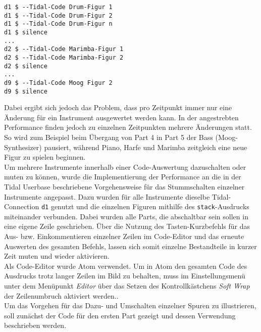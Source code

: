 \documentclass[
10pt, %
a4paper, %
oneside, %
headinclude,footinclude, %
BCOR5mm, %
]{scrartcl}
\begin{document}
\begin{lstlisting}
d1 $ --Tidal-Code Drum-Figur 1
d1 $ --Tidal-Code Drum-Figur 2
d1 $ --Tidal-Code Drum-Figur n
d1 $ silence
...
d2 $ --Tidal-Code Marimba-Figur 1
d2 $ --Tidal-Code Marimba-Figur 2
d2 $ silence
...
d9 $ --Tidal-Code Moog Figur 2
d9 $ silence
\end{lstlisting}

\noindent Dabei ergibt sich jedoch das Problem, dass pro Zeitpunkt immer nur eine Änderung für ein Instrument ausgewertet werden kann. In der angestrebten Performance finden jedoch zu einzelnen Zeitpunkten mehrere Änderungen statt. So wird zum Beispiel beim Übergang von Part 4 in Part 5 der Bass (Moog-Synthesizer) pausiert, während Piano, Harfe und Marimba zeitgleich eine neue Figur zu spielen beginnen.\\

\noindent Um mehrere Instrumente innerhalb einer Code-Auswertung dazuschalten oder muten zu können, wurde die Implementierung der Performance an die in der Tidal Userbase beschriebene Vorgehensweise für das Stummschalten einzelner Instrumente angepasst.\cite{tid13} Dazu wurden für alle Instrumente dieselbe Tidal-Connection \verb|d1| genutzt und die einzelnen Figuren mithilfe des \verb|stack|-Ausdrucks miteinander verbunden. Dabei wurden alle Parts, die abschaltbar sein sollen in eine eigene Zeile geschrieben. Über die Nutzung des Tasten-Kurzbefehls für das Aus- bzw. Einkommentieren einzelner Zeilen im Code-Editor und das erneute Auswerten des gesamten Befehls, lassen sich somit einzelne Bestandteile in kurzer Zeit muten und wieder aktivieren.\\
Als Code-Editor wurde Atom verwendet. Um in Atom den gesamten Code des Ausdrucks trotz langer Zeilen im Bild zu behalten, muss im Einstellungsmenü unter dem Menüpunkt \textit{Editor} über das Setzen des Kontrollkästchens \textit{Soft Wrap} der Zeilenumbruch aktiviert werden.\cite{atom1}. \\

\noindent Um das Vorgehen für das Dazu- und Umschalten einzelner Spuren zu illustrieren, soll zunächst der Code für den ersten Part gezeigt und dessen Verwendung beschrieben werden.

\lstset{
	numbers=left,
}

\end{document}
